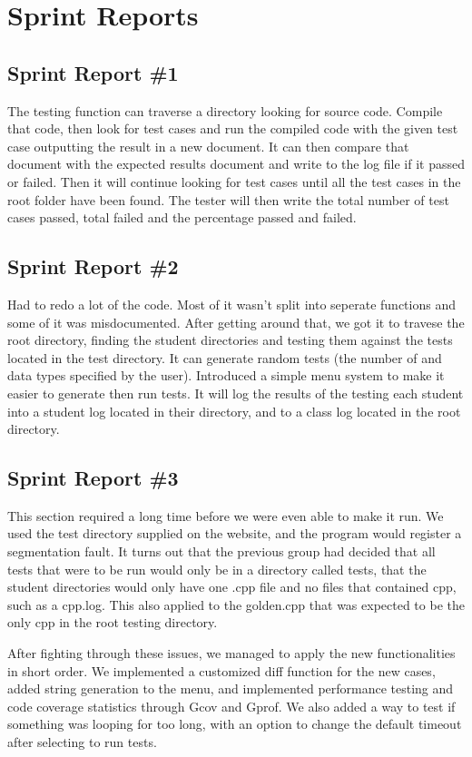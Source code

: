 
\chapter{Sprint Reports}

\section{Sprint Report \#1}
The testing function can traverse a directory looking for source code. Compile that code, then
look for test cases and run the compiled code with the given test case outputting the result in a 
new document. It can then compare that document with the expected results document and write
to the log file if it passed or failed. Then it will continue looking for test cases until all the test cases
in the root folder have been found. The tester will then write the total number of test cases passed,
total failed and the percentage passed and failed.

\section{Sprint Report \#2}

Had to redo a lot of the code. Most of it wasn't split into seperate functions and some of it was
misdocumented. After getting around that, we got it to travese the root directory, finding the
student directories and testing them against the tests located in the test directory. It can generate random
tests (the number of and data types specified by the user). Introduced a simple menu system to make it easier
to generate then run tests. It will log the results of the testing each student into a student log located in their
directory, and to a class log located in the root directory.

\section{Sprint Report \#3}

This section required a long time before we were even able to make it run. We used the test directory supplied on
the website, and the program would register a segmentation fault. It turns out that the previous group had
decided that all tests that were to be run would only be in a directory called tests, that the student directories
would only have one .cpp file and no files that contained cpp, such as a cpp.log. This also applied to the golden.cpp
that was expected to be the only cpp in the root testing directory.

After fighting through these issues, we managed to apply the new functionalities in short order. We implemented a
customized diff function for the new cases, added string generation to the menu, and implemented performance
testing and code coverage statistics through Gcov and Gprof. We also added a way to test if something was looping
for too long, with an option to change the default timeout after selecting to run tests. 
